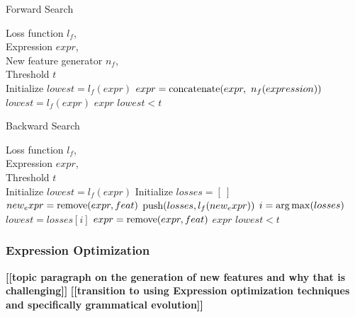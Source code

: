 \documentclass{article}
\newcommand{\todo}[1]{\textbf{[[#1]]}}
\begin{document}
\begin{algorithm}[tb]
   \caption{Forward Search}
   \label{alg:forwardsearch}
\begin{algorithmic}
    Loss function $l_f$, \\
   \quad \quad \quad Expression $expr$, \\
   \quad \quad \quad New feature generator $n_f$, \\
   \quad \quad \quad Threshold $t$ \\
   \STATE Initialize $lowest = l_f(expr)$
   \REPEAT
   \STATE $expr = {\rm concatenate}(expr, \ n_f(expression))$
   \STATE $lowest = l_f(expr)$
   \ELSE
    $expr$
   \ENDIF
   \UNTIL $lowest < t$
\end{algorithmic}
\end{algorithm}

\begin{algorithm}[tb]
   \caption{Backward Search}
   \label{alg:backwardsearch}
\begin{algorithmic}
    Loss function $l_f$, \\
   \quad \quad \quad Expression $expr$, \\
   \quad \quad \quad Threshold $t$ \\
   \STATE Initialize $lowest = l_f(expr)$
   \REPEAT
   \STATE Initialize $losses = [ \ ]$
   \STATE $new_expr = {\rm remove}(expr, feat)$
   \STATE ${\rm push}(losses, l_f(new_expr))$
   \ENDFOR
   \STATE $i = {\rm arg\,max}(losses)$
   \STATE $lowest = losses[i]$
   \STATE $expr = {\rm remove}(expr, feat)$
   \ELSE
    $expr$
   \ENDIF
   \UNTIL $lowest < t$
\end{algorithmic}
\end{algorithm}


\subsubsection{Expression Optimization}
\todo{topic paragraph on the generation of new features and why that is challenging}
\todo{transition to using Expression optimization techniques and specifically grammatical evolution}
\end{document}

